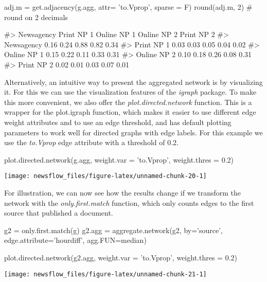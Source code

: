 \begin{Schunk}
\begin{Sinput}
adj.m = get.adjacency(g.agg, attr= 'to.Vprop', sparse = F)
round(adj.m, 2) # round on 2 decimals
\end{Sinput}
\begin{Soutput}
#>             Newsagency Print NP 1 Online NP 1 Online NP 2 Print NP 2
#> Newsagency        0.16       0.24        0.88        0.82       0.34
#> Print NP 1        0.03       0.03        0.05        0.04       0.02
#> Online NP 1       0.15       0.22        0.11        0.33       0.31
#> Online NP 2       0.10       0.18        0.26        0.08       0.31
#> Print NP 2        0.02       0.01        0.03        0.07       0.01
\end{Soutput}
\end{Schunk}

Alternatively, an intuitive way to present the aggregated network is by
visualizing it. For this we can use the visualization features of the
\emph{igraph} package. To make this more convenient, we also offer the
\emph{plot.directed.network} function. This is a wrapper for the
plot.igraph function, which makes it easier to use different edge weight
attributes and to use an edge threshold, and has default plotting
parameters to work well for directed graphs with edge labels. For this
example we use the \emph{to.Vprop} edge attribute with a threshold of
0.2.

\begin{Schunk}
\begin{Sinput}
plot.directed.network(g.agg, weight.var = 'to.Vprop',
                       weight.thres = 0.2)
\end{Sinput}


\begin{center}\texttt{[image: newsflow\_files/figure-latex/unnamed-chunk-20-1]} \end{center}

\end{Schunk}

For illustration, we can now see how the results change if we transform
the network with the \emph{only.first.match} function, which only counts
edges to the first source that published a document.

\begin{Schunk}
\begin{Sinput}
g2 = only.first.match(g)
g2.agg = aggregate.network(g2, by='source', edge.attribute='hourdiff', agg.FUN=median)

plot.directed.network(g2.agg, weight.var = 'to.Vprop',
                       weight.thres = 0.2)
\end{Sinput}


\begin{center}\texttt{[image: newsflow\_files/figure-latex/unnamed-chunk-21-1]} \end{center}

\end{Schunk}

